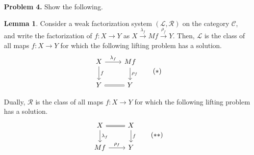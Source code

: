 \documentclass{article}
\theoremstyle{definition}
\newtheorem{lemma}[definition]{Lemma}
\newcommand{\C}{\mathcal C}
\begin{document}
\hspace{1em}

\noindent\textbf{Problem 4.} Show the following.

\begin{lemma}
  \label{lem:factorization}
  Consider a weak factorization system $(\mathcal L, \mathcal R)$ on the category $\C$, and write the factorization of $f: X \to Y$ as $X \xrightarrow{\lambda_f} Mf \xrightarrow{\rho_f} Y$.
  Then, $\mathcal L$ is the class of all maps $f: X \to Y$ for which the following lifting problem has a solution.
  \[
    \begin{tikzcd}
      X \ar[r,"\lambda_f"] \ar[d,"f"] & Mf \ar[d,"\rho_f"]
      \\
      Y \ar[r,equal] & Y
    \end{tikzcd}
    \tag{$*$}
  \]

  Dually, $\mathcal R$ is the class of all maps $f: X \to Y$ for which the following lifting problem has a solution.
  \[
    \begin{tikzcd}
      X \ar[r,equal] \ar[d,"\lambda_f"] & X \ar[d,"f"]
      \\
      Mf \ar[r,"\rho_f"] & Y
    \end{tikzcd}
    \tag{$**$}
  \]
\end{lemma}
\end{document}
